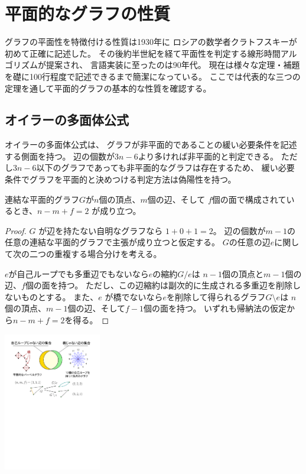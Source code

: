 
\section{平面的なグラフの性質}

グラフの平面性を特徴付ける性質は1930年に
ロシアの数学者クラトフスキーが初めて正確に記述した。
その後約半世紀を経て平面性を判定する線形時間アルゴリズムが提案され、
言語実装に至ったのは90年代。
現在は様々な定理・補題を礎に100行程度で記述できるまで簡潔になっている。
ここでは代表的な三つの定理を通して平面的グラフの基本的な性質を確認する。



\subsection{オイラーの多面体公式}
オイラーの多面体公式は、
グラフが非平面的であることの緩い必要条件を記述する側面を持つ。
辺の個数が$3n-6$より多ければ非平面的と判定できる。
ただし$3n-6$以下のグラフであっても非平面的なグラフは存在するため、
緩い必要条件でグラフを平面的と決めつける判定方法は偽陽性を持つ。


\begin{theorem}[オイラーの多面体公式]
連結な平面的グラフ$G$が$n$個の頂点、$m$個の辺、そして
$f$個の面で構成されているとき、$n - m + f = 2$ が成り立つ。
\end{theorem}
\vspace*{-0.7\intextsep}
\begin{paracol}{2}
\begin{proof}
$G$ が辺を持たない自明なグラフなら%
$1+0+1=2$。
辺の個数が$m-1$の任意の連結な平面的グラフで主張が成り立つと仮定する。
$G$の任意の辺$e$に関して次の二つの重複する場合分けを考える。

$e$が自己ループでも多重辺でもないなら$e$の縮約$G / e$は
$n-1$個の頂点と$m-1$個の辺、$f$個の面を持つ。
ただし、この辺縮約は副次的に生成される多重辺を削除しないものとする。
また、$e$ が橋でないなら$e$を削除して得られるグラフ$G \setminus e$は
$n$個の頂点、$m-1$個の辺、そして$f-1$個の面を持つ。
いずれも帰納法の仮定から$n - m + f = 2$を得る。
\end{proof}

\switchcolumn
\centering
\includegraphics[width=0.32\textwidth]{figures/sample_figure_in_proof_of_eular_formula.pdf}
\end{paracol}



